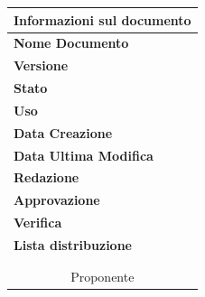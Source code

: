 \begin{titlepage}
\begin{center}
		\begin{table}[h]
			\begin{center}
			\begin{tabular}{l  l}
				\multicolumn{2}{c}{\textbf{Informazioni sul documento}}\\
				\midrule
				\textbf{Nome Documento}	&	\titoloDoc	\\
				\textbf{Versione}	&	\versione	\\
				\textbf{Stato}	&	\emph{\stato}	\\
				\textbf{Uso}	&	\emph{\uso}	\\
				\textbf{Data Creazione}	&	\dataCreazione	\\
				\textbf{Data Ultima Modifica}	&	\dataUM	\\
				\textbf{Redazione}	&	\redaz \\
				\textbf{Approvazione}	&	\appr \\
				\textbf{Verifica} & \verif \\
				\textbf{Lista distribuzione}	&	\emph{\gruppo} 	\\
				\multicolumn{2}{c}{\Vardanega}	\\
				\multicolumn{2}{c}{\Cardin}	\\
				\multicolumn{2}{c}{Proponente \Zucchetti}	\\
			\end{tabular}
			\end{center}
		\end{table}
	\end{center}
\end{titlepage}